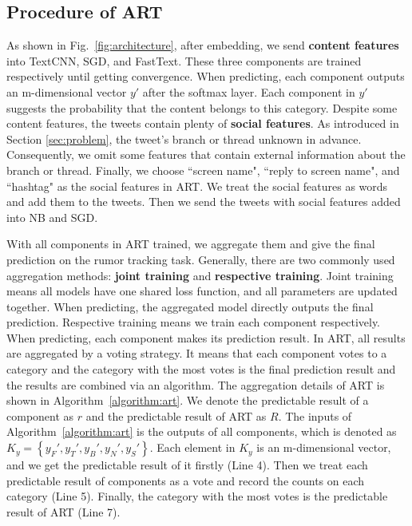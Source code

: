 \subsection{Procedure of ART}
As shown in Fig.~\ref{fig:architecture}, after embedding, we send \textbf{content features} into TextCNN, SGD, and FastText. These three components are trained respectively until getting convergence. When predicting, each component outputs an m-dimensional vector $y'$ after the softmax layer. Each component in $y'$ suggests the probability that the content belongs to this category. Despite some content features, the tweets contain plenty of \textbf{social features}. As introduced in Section \ref{sec:problem}, the tweet's branch or thread unknown in advance. Consequently, we omit some features that contain external information about the branch or thread. Finally, we choose ``screen name", ``reply to screen name", and ``hashtag" as the social features in ART. We treat the social features as words and add them to the tweets. Then we send the tweets with social features added into NB and SGD. 

With all components in ART trained, we aggregate them and give the final prediction on the rumor tracking task. Generally, there are two commonly used aggregation methods: \textbf{joint training} and \textbf{respective training}. Joint training means all models have one shared loss function, and all parameters are updated together. When predicting, the aggregated model directly outputs the final prediction. Respective training means we train each component respectively. When predicting, each component makes its prediction result. In ART, all results are aggregated by a voting strategy. It means that each component votes to a category and the category with the most votes is the final prediction result and the results are combined via an algorithm. The aggregation details of ART is shown in Algorithm~\ref{algorithm:art}. We denote the predictable result of a component as $r$ and the predictable result of ART as $R$. The inputs of Algorithm~\ref{algorithm:art} is the outputs of all components, which is denoted as $K_y = \left\{y_F', y_T', y_B', y_N', y_S' \right\}$. Each element in $K_y$ is an m-dimensional vector, and we get the predictable result of it firstly (Line 4). Then we treat each predictable result of components as a vote and record the counts on each category (Line 5). Finally, the category with the most votes is the predictable result of ART (Line 7). 
